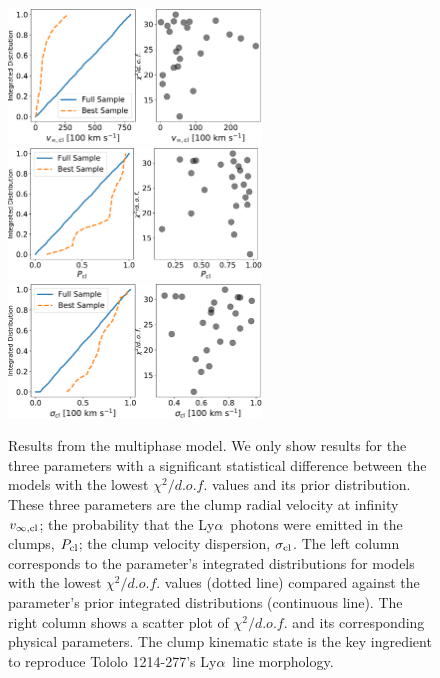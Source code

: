 \documentclass[a4paper,fleqn,usenatbib]{mnras}
\newcommand{\tol}{Tololo 1214-277}
\newcommand{\lya}{\ifmmode{{\rm Ly}\alpha}\else Ly$\alpha$\ \fi}
\begin{document}
\begin{figure}
\begin{center}
  \includegraphics[width=0.6\textwidth]{vinf_cl.pdf}
  \includegraphics[width=0.6\textwidth]{P_cl.pdf}
  \includegraphics[width=0.6\textwidth]{sigma_cl.pdf}
\caption{Results from the multiphase  model.
  We only show results for the three parameters with a significant
  statistical difference between the models with the lowest $\chi^2/d.o.f.$
  values and its prior distribution. 
  These three parameters are the clump radial velocity at infinity 
  $v_{\infty, \rm{cl}}$; the probability that  the \lya photons were
  emitted in the clumps, $P_{\rm cl}$; the clump velocity dispersion,
  $\sigma_{\rm cl}$.
  The left column corresponds to the parameter's integrated distributions for
  models with the lowest $\chi^2/d.o.f.$ values (dotted line) compared against the
  parameter's prior integrated distributions (continuous line).
  The right column shows a scatter plot of $\chi^2/d.o.f.$
  and its corresponding physical parameters.
  The clump kinematic state is the key ingredient to
  reproduce \tol's \lya line morphology.
  \label{multiphaseresults}
}  
\end{center}
\end{figure}
\end{document}
